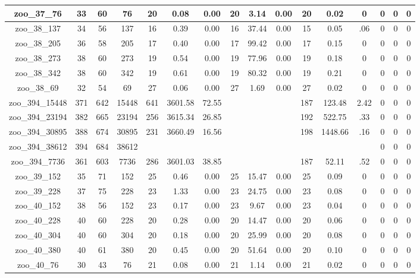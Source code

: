 \begin{landscape}
\begin{longtable}{|c|c|c|c|c|c|c|c|c|c|c|c|c|c|c|c|}
zoo\_37\_76 & 33 & 60 & 76 & 20 & 0.08 & 0.00 & 20 & 3.14 & 0.00 & 20 & 0.02 & 0 & 0 & 0 & 0 \\ \hline 
zoo\_38\_137 & 34 & 56 & 137 & 16 & 0.39 & 0.00 & 16 & 37.44 & 0.00 & 15 & 0.05 & .06 & 0 & 0 & 0 \\ \hline 
zoo\_38\_205 & 36 & 58 & 205 & 17 & 0.40 & 0.00 & 17 & 99.42 & 0.00 & 17 & 0.15 & 0 & 0 & 0 & 0 \\ \hline 
zoo\_38\_273 & 38 & 60 & 273 & 19 & 0.54 & 0.00 & 19 & 77.96 & 0.00 & 19 & 0.18 & 0 & 0 & 0 & 0 \\ \hline 
zoo\_38\_342 & 38 & 60 & 342 & 19 & 0.61 & 0.00 & 19 & 80.32 & 0.00 & 19 & 0.21 & 0 & 0 & 0 & 0 \\ \hline 
zoo\_38\_69 & 32 & 54 & 69 & 27 & 0.06 & 0.00 & 27 & 1.69 & 0.00 & 27 & 0.02 & 0 & 0 & 0 & 0 \\ \hline 
zoo\_394\_15448 & 371 & 642 & 15448 & 641 & 3601.58 & 72.55 &  &  &  & 187 & 123.48 & 2.42 & 0 & 0 & 0 \\ \hline 
zoo\_394\_23194 & 382 & 665 & 23194 & 256 & 3615.34 & 26.85 &  &  &  & 192 & 522.75 & .33 & 0 & 0 & 0 \\ \hline 
zoo\_394\_30895 & 388 & 674 & 30895 & 231 & 3660.49 & 16.56 &  &  &  & 198 & 1448.66 & .16 & 0 & 0 & 0 \\ \hline 
zoo\_394\_38612 & 394 & 684 & 38612 &  &  &  &  &  &  &  &  &  & 0 & 0 & 0 \\ \hline 
zoo\_394\_7736 & 361 & 603 & 7736 & 286 & 3601.03 & 38.85 &  &  &  & 187 & 52.11 & .52 & 0 & 0 & 0 \\ \hline 
zoo\_39\_152 & 35 & 71 & 152 & 25 & 0.46 & 0.00 & 25 & 15.47 & 0.00 & 25 & 0.09 & 0 & 0 & 0 & 0 \\ \hline 
zoo\_39\_228 & 37 & 75 & 228 & 23 & 1.33 & 0.00 & 23 & 24.75 & 0.00 & 23 & 0.08 & 0 & 0 & 0 & 0 \\ \hline 
zoo\_40\_152 & 38 & 56 & 152 & 23 & 0.17 & 0.00 & 23 & 9.67 & 0.00 & 23 & 0.04 & 0 & 0 & 0 & 0 \\ \hline 
zoo\_40\_228 & 40 & 60 & 228 & 20 & 0.28 & 0.00 & 20 & 14.47 & 0.00 & 20 & 0.06 & 0 & 0 & 0 & 0 \\ \hline 
zoo\_40\_304 & 40 & 60 & 304 & 20 & 0.18 & 0.00 & 20 & 25.99 & 0.00 & 20 & 0.08 & 0 & 0 & 0 & 0 \\ \hline 
zoo\_40\_380 & 40 & 61 & 380 & 20 & 0.45 & 0.00 & 20 & 51.64 & 0.00 & 20 & 0.10 & 0 & 0 & 0 & 0 \\ \hline 
zoo\_40\_76 & 30 & 43 & 76 & 21 & 0.08 & 0.00 & 21 & 1.14 & 0.00 & 21 & 0.02 & 0 & 0 & 0 & 0 \\ \hline 

\end{longtable}
\end{landscape}

